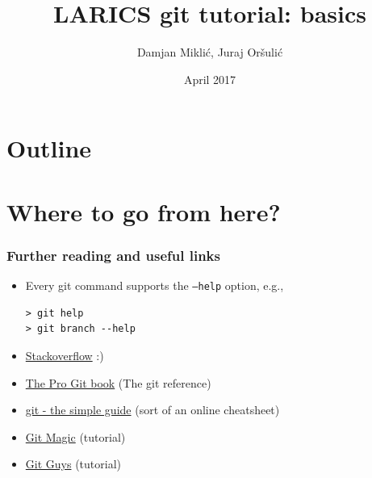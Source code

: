 \documentclass{beamer}%
\title[git basics]
{LARICS git tutorial: basics}
\author[Mikli\'{c}, Or\v{s}uli\'{c}]{Damjan Mikli\'{c}, Juraj Or\v{s}uli\'{c}}
\institute[LARICS]{LARICS Lab\\FER, University of Zagreb}
\date[]{April 2017}
\begin{document}

\begin{frame}
	\titlepage
\end{frame}


\section*{Outline}
\begin {frame}
	\tableofcontents
\end{frame}












\section{Where to go from here?}

\begin{frame}[fragile]

\frametitle{Further reading and useful links}
	
\begin{itemize}
	\item Every git command supports the \texttt{--help} option, e.g.,
	\begin{verbatim}
> git help
> git branch --help
	\end{verbatim}
	\item \href{http://stackoverflow.com/questions/tagged/git}{Stackoverflow} :)
	\item \href{https://git-scm.com/book/en/v2}{The Pro Git book} (The git reference)
	\item \href{http://rogerdudler.github.io/git-guide/}{git - the simple guide} (sort of an online cheatsheet)
	\item \href{http://www-cs-students.stanford.edu/~blynn/gitmagic/}{Git Magic} (tutorial) 
	\item \href{http://www.gitguys.com/}{Git Guys} (tutorial)
	\end{itemize}
	
\end{frame}
\end{document}
